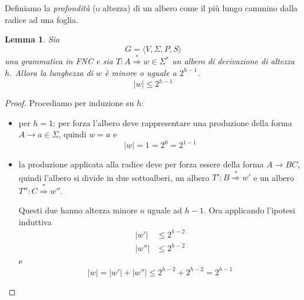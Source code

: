 \documentclass[12pt]{report}
\newtheorem{lemma}{Lemma}
\begin{document}
Definiamo la \textit{profondità} (o altezza) di un albero come il più lungo cammino dalla radice ad una foglia.
\begin{lemma}
	Sia
	$$ G = \langle V, \Sigma, P, S \rangle $$
	una grammatica in FNC e sia $T : A \overset{*}{\Rightarrow} w \in \Sigma^*$ un albero di derivazione di altezza $h$.
	Allora la lunghezza di $w$ è minore o uguale a $2^{h - 1}$.
	$$ |w| \leq 2^{h - 1} $$
\end{lemma}
\begin{proof}
	Procediamo per induzione su $h$:
	\begin{itemize}
		\item per $h = 1$: per forza l'albero deve rappresentare una produzione della forma $A \rightarrow a \in \Sigma$, quindi $ w = a $ e 
			$$ |w| = 1 = 2^0 = 2^{1 - 1} $$
		\item la produzione applicata alla radice deve per forza essere della forma $A \rightarrow B C$, quindi l'albero si divide in due sottoalberi, un albero $T' : B \overset{*}{\Rightarrow} w'$ e un albero $T'' : C \overset{*}{\Rightarrow} w''$.
			\begin{center}
			\end{center}
			Questi due hanno altezza minore o uguale ad $h - 1$.
			Ora applicando l'ipotesi induttiva 
			\begin{align*}
				|w'| &\leq 2^{h - 2} \\
				|w''| &\leq 2^{h - 2}
			\end{align*}
			e 
			$$ |w| = |w'| + |w''| \leq 2^{h - 2} + 2^{h - 2} = 2^{h - 1} $$
	\end{itemize}
\end{proof}
\end{document}
